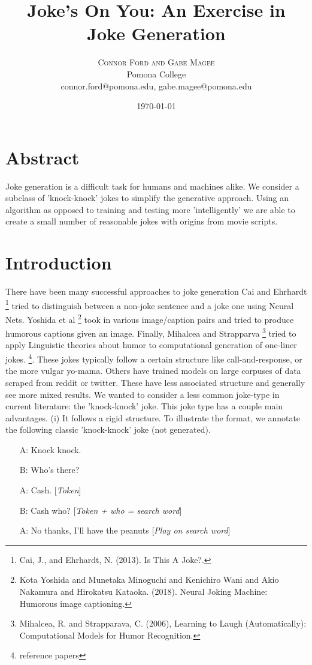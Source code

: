 \documentclass[twoside,twocolumn]{article}
\title{Joke's On You: An Exercise in Joke Generation}
\author{%
\textsc{Connor Ford and Gabe Magee} \\[1ex] 
\normalsize Pomona College \\ 
\normalsize connor.ford@pomona.edu, gabe.magee@pomona.edu
}
\date{\today}
\begin{document}
\maketitle

\section*{Abstract}

Joke generation is a difficult task for humans and machines alike. 
We consider a subclass of 'knock-knock' jokes to simplify the generative approach.
Using an algorithm as opposed to training and testing more 'intelligently' we are able to create a small number of reasonable jokes with origins from movie scripts.

\section{Introduction}

There have been many successful approaches to joke generation 
Cai and Ehrhardt \footnote{Cai, J., and Ehrhardt, N. (2013). Is This A Joke?.} tried to distinguish between a non-joke sentence and a joke one using Neural Nets. 
Yoshida et al \footnote{Kota Yoshida and Munetaka Minoguchi and Kenichiro Wani and Akio Nakamura and Hirokatsu Kataoka. (2018). Neural Joking Machine: Humorous image captioning.} took in various image/caption pairs and tried to produce humorous captions given an image. 
Finally, Mihalcea and Strapparva \footnote{Mihalcea, R. and Strapparava, C. (2006), Learning to Laugh (Automatically): Computational Models for Humor Recognition.} tried to apply Linguistic theories about humor to computational generation of one-liner jokes. 
\footnote{reference papers}.
These jokes typically follow a certain structure like call-and-response, or the more vulgar yo-mama. 
Others have trained models on large corpuses of data scraped from reddit or twitter. These have less associated structure and generally see more mixed results.
We wanted to consider a less common joke-type in current literature: the 'knock-knock' joke. This joke type has a couple main advantages.
(i) It follows a rigid structure. To illustrate the format, we annotate the following classic 'knock-knock' joke (not generated).
\begin{center}
\begin{enumerate}
\item[A:] Knock knock.
\item[B:] Who's there?
\item[A:] Cash. [\emph{Token}]
\item[B:] Cash who? [\emph{Token + who = search word}]
\item[A:] No thanks, I'll have the peanuts [\emph{Play on search word}]
\end{enumerate}
\end{center}
\end{document}
